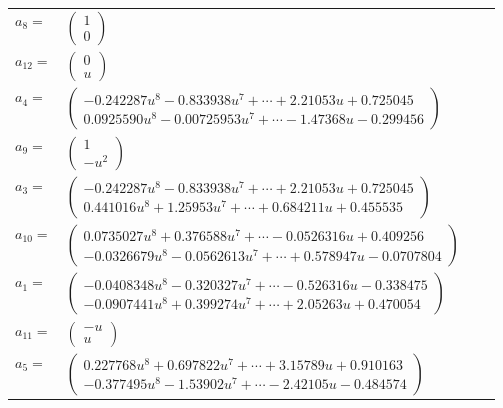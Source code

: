 \documentclass[1p]{elsarticle_modified}
\theoremstyle{definition}
\begin{document}
\begin{tabular}{m{7pt} m{180pt} m{7pt} m{180pt} }
\flushright $a_{8}=$&$\begin{pmatrix}1\\0\end{pmatrix}$ \\
\flushright $a_{12}=$&$\begin{pmatrix}0\\u\end{pmatrix}$ \\
\flushright $a_{4}=$&$\begin{pmatrix}-0.242287 u^{8}-0.833938 u^{7}+\cdots+2.21053 u+0.725045\\0.0925590 u^{8}-0.00725953 u^{7}+\cdots-1.47368 u-0.299456\end{pmatrix}$ \\
\flushright $a_{9}=$&$\begin{pmatrix}1\\- u^2\end{pmatrix}$ \\
\flushright $a_{3}=$&$\begin{pmatrix}-0.242287 u^{8}-0.833938 u^{7}+\cdots+2.21053 u+0.725045\\0.441016 u^{8}+1.25953 u^{7}+\cdots+0.684211 u+0.455535\end{pmatrix}$ \\
\flushright $a_{10}=$&$\begin{pmatrix}0.0735027 u^{8}+0.376588 u^{7}+\cdots-0.0526316 u+0.409256\\-0.0326679 u^{8}-0.0562613 u^{7}+\cdots+0.578947 u-0.0707804\end{pmatrix}$ \\
\flushright $a_{1}=$&$\begin{pmatrix}-0.0408348 u^{8}-0.320327 u^{7}+\cdots-0.526316 u-0.338475\\-0.0907441 u^{8}+0.399274 u^{7}+\cdots+2.05263 u+0.470054\end{pmatrix}$ \\
\flushright $a_{11}=$&$\begin{pmatrix}- u\\u\end{pmatrix}$ \\
\flushright $a_{5}=$&$\begin{pmatrix}0.227768 u^{8}+0.697822 u^{7}+\cdots+3.15789 u+0.910163\\-0.377495 u^{8}-1.53902 u^{7}+\cdots-2.42105 u-0.484574\end{pmatrix}$ \\

\end{tabular}
\end{document}
